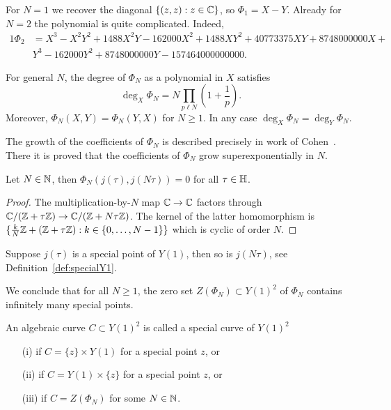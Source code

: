 \begin{example}
  For $N=1$ we recover the diagonal $\{(z,z) : z\in{\mathbb{C}}\}$, so $\Phi_1
  = X-Y$. 
  Already for $N=2$ the polynomial is quite complicated. Indeed,
  \begin{alignat*}1
    \Phi_2 &= 
    X^3 - X^2Y^2 + 1488X^2Y - 162000X^2 + 1488XY^2+ 40773375XY +
    8748000000X + \\
    &Y^3 - 162000Y^2 + 8748000000Y -157464000000000.    
  \end{alignat*}

  For general $N$, the degree of $\Phi_N$ as a polynomial in $X$
  satisfies
  \begin{equation*}
    \deg_X \Phi_N = N\prod_{p\ell N}\left(1+\frac 1p\right). 
  \end{equation*}
  Moreover, $\Phi_N(X,Y) = \Phi_N(Y,X)$ for $N\ge 1$. In any case
  $\deg_X \Phi_N = \deg_Y \Phi_N$.

  The growth of the coefficients of $\Phi_N$ is described precisely in
  work of Cohen~\cite{Cohen}. There it is proved that the
  coefficients of $\Phi_N$ grow superexponentially in $N$. 
\end{example}

\begin{lemma}
  Let $N\in{\mathbb{N}}$, then $\Phi_N(j(\tau),j(N\tau))=0$ for all
  $\tau\in{\mathbb{H}}$. 
\end{lemma}
\begin{proof}
  The multiplication-by-$N$ map ${\mathbb{C}}\rightarrow{\mathbb{C}}$ factors through
  ${\mathbb{C}}/({\mathbb{Z}}+\tau{\mathbb{Z}}) \rightarrow {\mathbb{C}}/({\mathbb{Z}}+N\tau{\mathbb{Z}})$.
  The kernel of the latter homomorphism is $\{\frac kN {\mathbb{Z}}
  +({\mathbb{Z}}+\tau{\mathbb{Z}}) : k\in \{0,\ldots,N-1\}\}$ which is cyclic of order
  $N$.  
\end{proof}

Suppose $j(\tau)$ is a special point of $Y(1)$, then so is $j(N\tau)$,
see Definition~\ref{def:specialY1}.

We conclude that for all $N\ge 1$, the zero set $Z(\Phi_N)\subset
Y(1)^2$ of $\Phi_N$ contains infinitely many special points.

\begin{definition}
  An algebraic curve  $C\subset Y(1)^2$ is called a special curve of
  $Y(1)^2$ 
  \begin{enumerate}
  \item [(i)] if $C = \{z\}\times Y(1)$ for a special point $z$, or
\item [(ii)] if $C =  Y(1)\times \{z\}$ for a special point $z$, or
\item[(iii)] if $C=Z(\Phi_N)$ for some $N\in{\mathbb{N}}$. 
\end{enumerate}
\end{definition}

